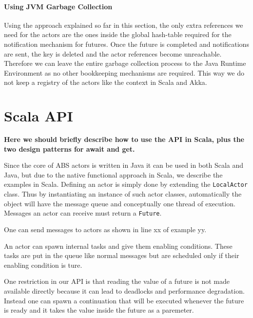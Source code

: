 \paragraph{Using JVM Garbage Collection}
Using the approach explained so far in this section, the only extra references we need for the actors are the ones inside the global hash-table required for the notification mechanism for futures. Once the future is completed and notifications are sent, the key is deleted and the actor references become unreachable. Therefore we can leave the entire garbage collection process to the Java Runtime Environment as no other bookkeeping mechanisms are required. This way we do not keep a registry of the actors like the {\ttfamily context} in Scala and Akka.

\section{Scala API}

\newcommand{\future}{\lstinline{Future}}

{\bf Here we should briefly describe how to use the API in Scala, plus the two design patterns for await and get.}

Since the core of ABS actors is written in Java it can be used in both Scala and Java, but due to the native functional approach in Scala, we describe the examples in Scala.
Defining an actor is simply done by extending the \lstinline{LocalActor} class. Thus by instantiating an instance of such actor classes, automatically the object will have the message queue and conceptually one thread of execution. Messages an actor can receive must return a \future. 

One can send messages to actors as shown in line xx of example yy.

An actor can spawn internal tasks and give them enabling conditions. These tasks are put in the queue like normal messages but are scheduled only if their enabling condition is ture.

One restriction in our API is that reading the value of a future is not made available directly because it can lead to deadlocks and performance degradation. Instead one can spawn a continuation that will be executed whenever the future is ready and it takes the value inside the future as a paremeter.







